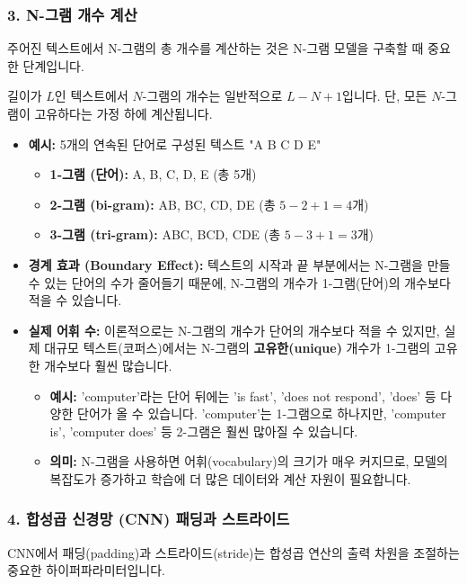 \documentclass[11pt,a4paper]{article}
\begin{document}
\subsubsection*{3. N-그램 개수 계산}
주어진 텍스트에서 N-그램의 총 개수를 계산하는 것은 N-그램 모델을 구축할 때 중요한 단계입니다.

\begin{tcolorbox}[mybox, title=N-그램 개수 계산 공식]
길이가 $L$인 텍스트에서 $N$-그램의 개수는 일반적으로 $L - N + 1$입니다.
단, 모든 $N$-그램이 고유하다는 가정 하에 계산됩니다.
\end{tcolorbox}

\begin{itemize}
    \item \textbf{예시:} 5개의 연속된 단어로 구성된 텍스트 "A B C D E"
    \begin{itemize}
        \item \textbf{1-그램 (단어):} A, B, C, D, E (총 5개)
        \item \textbf{2-그램 (bi-gram):} AB, BC, CD, DE (총 $5 - 2 + 1 = 4$개)
        \item \textbf{3-그램 (tri-gram):} ABC, BCD, CDE (총 $5 - 3 + 1 = 3$개)
    \end{itemize}
    \item \textbf{경계 효과 (Boundary Effect):} 텍스트의 시작과 끝 부분에서는 N-그램을 만들 수 있는 단어의 수가 줄어들기 때문에, N-그램의 개수가 1-그램(단어)의 개수보다 적을 수 있습니다.
    \item \textbf{실제 어휘 수:} 이론적으로는 N-그램의 개수가 단어의 개수보다 적을 수 있지만, 실제 대규모 텍스트(코퍼스)에서는 N-그램의 \textbf{고유한(unique)} 개수가 1-그램의 고유한 개수보다 훨씬 많습니다.
    \begin{itemize}
        \item \textbf{예시:} 'computer'라는 단어 뒤에는 'is fast', 'does not respond', 'does' 등 다양한 단어가 올 수 있습니다. 'computer'는 1-그램으로 하나지만, 'computer is', 'computer does' 등 2-그램은 훨씬 많아질 수 있습니다.
        \item \textbf{의미:} N-그램을 사용하면 어휘(vocabulary)의 크기가 매우 커지므로, 모델의 복잡도가 증가하고 학습에 더 많은 데이터와 계산 자원이 필요합니다.
    \end{itemize}
\end{itemize}

\subsubsection*{4. 합성곱 신경망 (CNN) 패딩과 스트라이드}
CNN에서 패딩(padding)과 스트라이드(stride)는 합성곱 연산의 출력 차원을 조절하는 중요한 하이퍼파라미터입니다.
\end{document}
